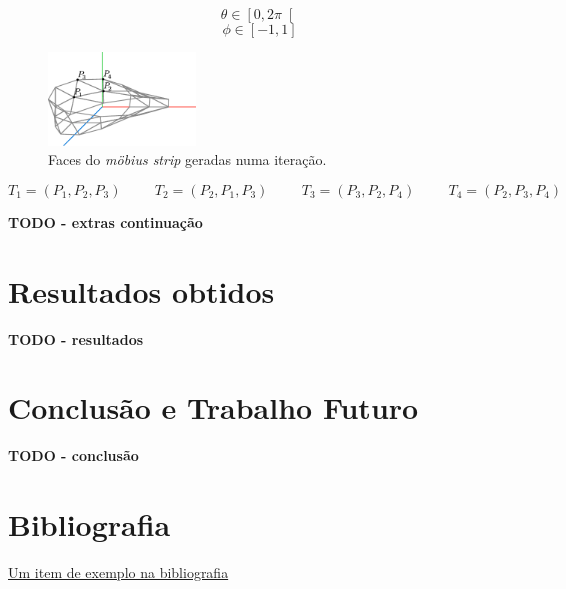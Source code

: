 \documentclass[12pt, a4paper]{article}
\begin{document}
$$\theta \in \left [ 0, 2 \pi \right [$$
$$\phi \in \left [ -1, 1 \right ]$$

\begin{figure}[H]
    \centering
    \includegraphics[width=0.35\textwidth]{res/phase2/figures/MobiusStrip.pdf}
    \caption{Faces do \emph{möbius strip} geradas numa iteração.}
\end{figure}

$$
T_1 = (P_1, P_2, P_3)
\hspace{1cm}
T_2 = (P_2, P_1, P_3)
\hspace{1cm}
T_3 = (P_3, P_2, P_4)
\hspace{1cm}
T_4 = (P_2, P_3, P_4)
$$


\textbf{\color{red} TODO - extras continuação}

\section{Resultados obtidos}

\textbf{\color{red} TODO - resultados}

\section{Conclusão e Trabalho Futuro}

\textbf{\color{red} TODO - conclusão}

\begingroup
\section{Bibliografia}
\renewcommand{\section}[2]{}

\begin{thebibliography}{9}
        \href{https://youtu.be/dQw4w9WgXcQ}{Um item de exemplo na bibliografia}
\end{thebibliography}
\endgroup
\end{document}
